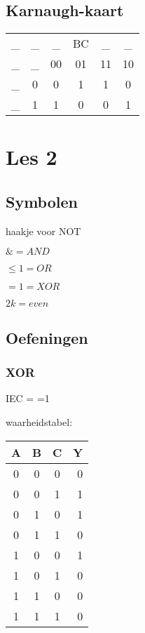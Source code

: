 \documentclass[11pt, a4paper]{article}
\begin{document}
\subsection{Karnaugh-kaart}

\begin{tabular}{c c | c | c | c | c |}
  \_ & \_ & \_ & BC & \_ & \_\\
  \_ & \_ & 00 & 01 & 11 & 10 \\
   \hline
   \_ & 0 &  0 & 1 & 1 & 0 \\
   \hline
   \_ & 1 &  1 & 0 & 0 & 1 \\
   \hline
\end{tabular}

\newpage

\section{Les 2}

\subsection{Symbolen}

haakje voor NOT

$\& = AND$

$\le1 = OR$

$=1 = XOR$

$2k = even$

\subsection{Oefeningen}

\subsubsection{XOR}

IEC = =1

waarheidstabel:

\begin{tabular}{c c c || r}
A & B & C & Y \\
\hline
0 & 0 & 0 & 0 \\
0 & 0 & 1 & 1 \\
0 & 1 & 0 & 1 \\
0 & 1 & 1 & 0 \\
1 & 0 & 0 & 1 \\
1 & 0 & 1 & 0 \\
1 & 1 & 0 & 0 \\
1 & 1 & 1 & 0 \\
\end{tabular}
\end{document}
